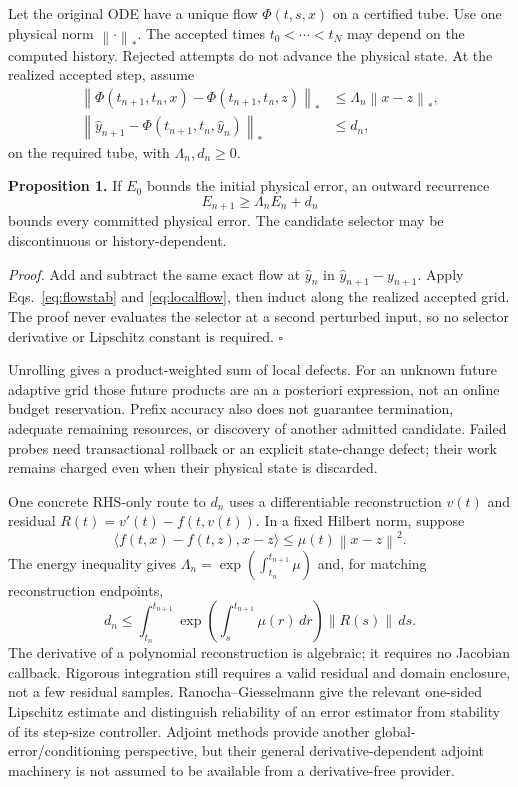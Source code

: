 \documentclass[aps,pra,reprint,onecolumn,10pt,notitlepage,nofootinbib]{revtex4-2}
\newcommand{\norm}[1]{\left\|#1\right\|}
\begin{document}
Let the original ODE have a unique flow $\Phi(t,s,x)$ on a certified tube.
Use one physical norm $\norm{\cdot}_*$. The accepted times
$t_0<\cdots<t_N$ may depend on the computed history. Rejected attempts do
not advance the physical state. At the realized accepted step, assume
\begin{align}
 \norm{\Phi(t_{n+1},t_n,x)-\Phi(t_{n+1},t_n,z)}_*
   &\le \Lambda_n\norm{x-z}_*,\label{eq:flowstab}\\
 \norm{\widehat y_{n+1}-\Phi(t_{n+1},t_n,\widehat y_n)}_*
   &\le d_n,\label{eq:localflow}
\end{align}
on the required tube, with $\Lambda_n,d_n\ge0$.

\textbf{Proposition 1.} If $E_0$ bounds the initial physical error, an outward
recurrence
\begin{equation}
 E_{n+1}\ge\Lambda_nE_n+d_n                                    \label{eq:induction}
\end{equation}
bounds every committed physical error. The candidate selector may be
discontinuous or history-dependent.

\emph{Proof.} Add and subtract the same exact flow at $\widehat y_n$ in
$\widehat y_{n+1}-y_{n+1}$. Apply Eqs.~\eqref{eq:flowstab} and
\eqref{eq:localflow}, then induct along the realized accepted grid. The proof
never evaluates the selector at a second perturbed input, so no selector
derivative or Lipschitz constant is required. \hfill$\square$

Unrolling gives a product-weighted sum of local defects. For an unknown future
adaptive grid those future products are an a posteriori expression, not an
online budget reservation. Prefix accuracy also does not guarantee termination,
adequate remaining resources, or discovery of another admitted candidate.
Failed probes need transactional rollback or an explicit state-change defect;
their work remains charged even when their physical state is discarded.

One concrete RHS-only route to $d_n$ uses a differentiable reconstruction
$v(t)$ and residual $R(t)=v'(t)-f(t,v(t))$. In a fixed Hilbert norm, suppose
\begin{equation}
 \langle f(t,x)-f(t,z),x-z\rangle
 \le\mu(t)\norm{x-z}^2.
\end{equation}
The energy inequality gives $\Lambda_n=\exp(\int_{t_n}^{t_{n+1}}\mu)$ and,
for matching reconstruction endpoints,
\begin{equation}
 d_n\le\int_{t_n}^{t_{n+1}}
       \exp\!\left(\int_s^{t_{n+1}}\mu(r)\,dr\right)
       \norm{R(s)}\,ds.                                      \label{eq:residualflow}
\end{equation}
The derivative of a polynomial reconstruction is algebraic; it requires no
Jacobian callback. Rigorous integration still requires a valid residual and
domain enclosure, not a few residual samples. Ranocha--Giesselmann give the
relevant one-sided Lipschitz estimate and distinguish reliability of an error
estimator from stability of its step-size controller\cite{RG2024}. Adjoint
methods provide another global-error/conditioning perspective\cite{CP2004},
but their general derivative-dependent adjoint machinery is not assumed to
be available from a derivative-free provider.
\end{document}
